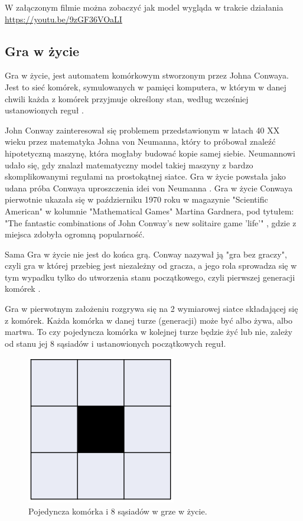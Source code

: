 \documentclass[a4paper,12pt,reqno]{article}
\begin{document}
W załączonym filmie można zobaczyć jak model wygląda w trakcie działania \url{https://youtu.be/9zGF36VOaLI}

\newpage
\subsection{Gra w życie}

Gra w życie, jest automatem komórkowym stworzonym przez Johna Conwaya. Jest to sieć komórek, symulowanych w pamięci komputera, w którym w danej chwili każda z komórek przyjmuje określony stan, według wcześniej ustanowionych reguł \cite{game_of_life_zero_cellular_automata}. 

John Conway zainteresował się problemem przedstawionym w latach 40 XX wieku przez matematyka Johna von Neumanna, który to próbował znaleźć hipotetyczną maszynę, która mogłaby budować kopie samej siebie. Neumannowi udało się, gdy znalazł matematyczny model takiej maszyny z bardzo skomplikowanymi regułami na prostokątnej siatce. Gra w życie powstała jako udana próba Conwaya uproszczenia idei von Neumanna \cite{game_of_life_story}. Gra w życie Conwaya pierwotnie ukazała się w październiku 1970 roku w magazynie "Scientific American" w kolumnie "Mathematical Games" Martina Gardnera, pod tytułem: "The fantastic combinations of John Conway's new solitaire game 'life'" \cite{game_of_life_methematical_games}, gdzie z miejsca zdobyła ogromną popularność.


 Sama Gra w życie nie jest do końca grą. Conway nazywał ją "gra bez graczy", czyli gra w której przebieg jest niezależny od gracza, a jego rola sprowadza się w tym wypadku tylko do utworzenia stanu początkowego, czyli pierwszej generacji komórek \cite{game_of_life_zero_player}. 


 Gra w pierwotnym założeniu rozgrywa się na 2 wymiarowej siatce składającej się z komórek. Każda komórka w danej turze (generacji) może być albo żywa, albo martwa. To czy pojedyncza komórka w kolejnej turze będzie żyć lub nie, zależy od stanu jej 8 sąsiadów i ustanowionych początkowych reguł.

\begin{figure}[!ht]%
\centering
\includegraphics[width=0.2\columnwidth]{graphics//gameoflife/GOL_Cell.png}
\caption{Pojedyncza komórka i 8 sąsiadów w grze w życie.
\label{BPExample}}%
%
\qquad
\end{figure} 
\end{document}
